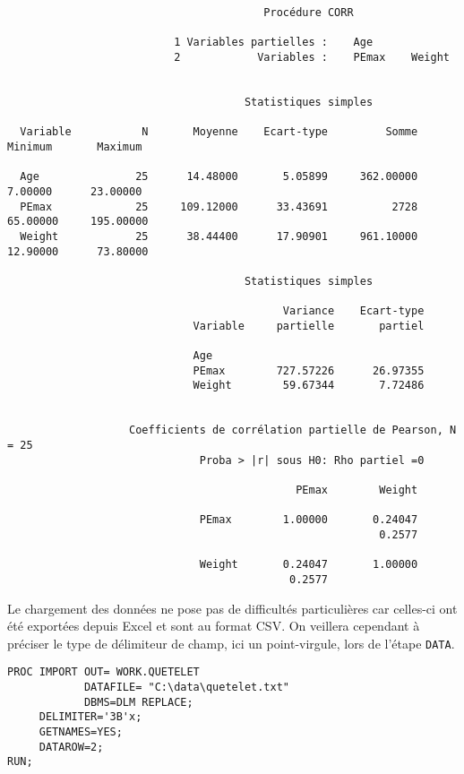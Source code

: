 \begin{verbatim}
                                        Procédure CORR

                          1 Variables partielles :    Age
                          2            Variables :    PEmax    Weight


                                     Statistiques simples

  Variable           N       Moyenne    Ecart-type         Somme       Minimum       Maximum

  Age               25      14.48000       5.05899     362.00000       7.00000      23.00000
  PEmax             25     109.12000      33.43691          2728      65.00000     195.00000
  Weight            25      38.44400      17.90901     961.10000      12.90000      73.80000

                                     Statistiques simples

                                           Variance    Ecart-type
                             Variable     partielle       partiel

                             Age
                             PEmax        727.57226      26.97355
                             Weight        59.67344       7.72486


                   Coefficients de corrélation partielle de Pearson, N = 25
                              Proba > |r| sous H0: Rho partiel =0

                                             PEmax        Weight

                              PEmax        1.00000       0.24047
                                                          0.2577

                              Weight       0.24047       1.00000
                                            0.2577
\end{verbatim}


\soln{\ref{exo:10.2}} Le chargement des données ne pose pas de difficultés
particulières car celles-ci ont été exportées depuis Excel et sont au format
CSV. On veillera cependant à préciser le type de délimiteur de champ, ici un
point-virgule, lors de l'étape \texttt{DATA}.
\begin{verbatim}
PROC IMPORT OUT= WORK.QUETELET
            DATAFILE= "C:\data\quetelet.txt"
            DBMS=DLM REPLACE;
     DELIMITER='3B'x;
     GETNAMES=YES;
     DATAROW=2;
RUN;
\end{verbatim}

